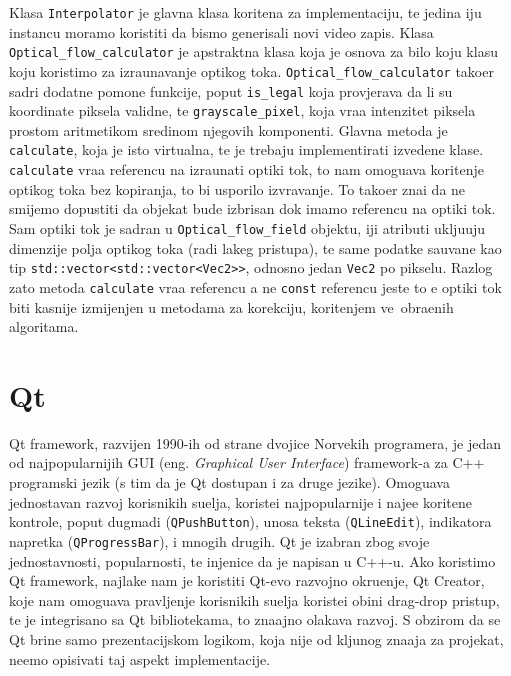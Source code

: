 Klasa \lstinline{Interpolator} je glavna klasa kori\sh tena za implementaciju, te jedina \ch iju instancu moramo koristiti da bismo generisali novi video zapis. Klasa \lstinline{Optical_flow_calculator}
je apstraktna klasa koja je osnova za bilo koju klasu koju koristimo za izra\ch unavanje opti\ch kog toka. \lstinline{Optical_flow_calculator} tako\dj er sadr\zh i dodatne pomo\cj ne funkcije, poput
\lstinline{is_legal} koja provjerava da li su koordinate piksela validne, te \lstinline{grayscale_pixel}, koja vra\cj a intenzitet piksela prostom aritmeti\ch kom sredinom njegovih komponenti.
Glavna metoda je \lstinline{calculate}, koja je \ch isto virtualna, te je trebaju implementirati izvedene klase. \lstinline{calculate} vra\cj a referencu na izra\ch unati opti\ch ki tok, \sh to nam omogu\cj ava
kori\sh tenje opti\ch kog toka bez kopiranja, \sh to bi usporilo izvr\sh avanje. To tako\dj er zna\ch i da ne smijemo dopustiti da objekat bude izbrisan dok imamo referencu na opti\ch ki tok.
Sam opti\ch ki tok je sadr\zh an u \lstinline{Optical_flow_field} objektu, \ch iji atributi uklju\ch uju dimenzije polja opti\ch kog toka (radi lak\sh eg pristupa), te same podatke sa\ch uvane kao tip
\lstinline{std::vector<std::vector<Vec2>>}, odnosno jedan \lstinline{Vec2} po pikselu. Razlog za\sh to metoda \lstinline{calculate} vra\cj a referencu a ne \lstinline{const} referencu jeste \sh to \cj e
opti\ch ki tok biti kasnije izmijenjen u metodama za korekciju, kori\sh tenjem ve\cj\ obra\dj enih algoritama.

\section{Qt} %
Qt framework, razvijen 1990-ih od strane dvojice Norve\sh kih programera, je jedan od najpopularnijih GUI (eng. \textit{Graphical User Interface}) framework-a za C++ programski jezik (s tim da je
Qt dostupan i za druge jezike). Omogu\cj ava jednostavan razvoj korisni\ch kih su\ch elja, koriste\cj i najpopularnije i naj\ch e\sh \cj e kori\sh tene kontrole, poput dugmadi (\lstinline{QPushButton}),
unosa teksta (\lstinline{QLineEdit}), indikatora napretka (\lstinline{QProgressBar}), i mnogih drugih. Qt je izabran zbog svoje jednostavnosti, popularnosti, te \ch injenice da je napisan u C++-u.
Ako koristimo Qt framework, najlak\sh e nam je koristiti Qt-evo razvojno okru\zh enje, Qt Creator, koje nam omogu\cj ava pravljenje korisni\ch kih su\ch elja koriste\cj i obi\ch ni drag-drop pristup,
te je integrisano sa Qt bibliotekama, \sh to zna\ch ajno olak\sh ava razvoj\cite{qtabout}.
S obzirom da se Qt brine samo prezentacijskom logikom, koja nije od klju\ch nog zna\ch aja za projekat, ne\cj emo opisivati taj aspekt implementacije.


